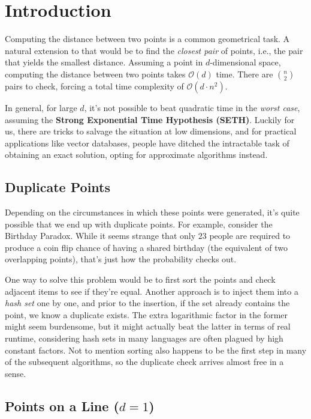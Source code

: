 
\chapter{Introduction}

Computing the distance between two points is a common geometrical task.
A natural extension to that would be to find the \textit{closest pair} of points,
i.e., the pair that yields the smallest distance. Assuming a point in $d$-dimensional
space, computing the distance between two points takes $\mathcal{O}(d)$ time.
There are $\binom{n}{2}$ pairs to check, forcing a total time complexity of
$\mathcal{O}(d \cdot n^{2})$.

In general, for large $d$, it's not possible to beat quadratic time in the \textit{worst case}, assuming the
\textbf{Strong Exponential Time Hypothesis (SETH)}. Luckily for us, there are tricks to salvage
the situation at low dimensions, and for practical applications like vector databases,
people have ditched the intractable task of obtaining an exact solution, opting for
approximate algorithms instead.

\section{Duplicate Points}

Depending on the circumstances in which these points were generated, it's quite possible that we
end up with duplicate points. For example, consider the Birthday Paradox. While it seems strange
that only $23$ people are required to produce a coin flip chance of having a shared birthday
(the equivalent of two overlapping points), that's just how the probability checks out.

One way to solve this problem would be to first sort the points and check adjacent items to see if
they're equal. Another approach is to inject them into a \textit{hash set} one by one, and prior to the
insertion, if the set already contains the point, we know a duplicate exists. The extra logarithmic
factor in the former might seem burdensome, but it might actually beat the latter in terms of real
runtime, considering hash sets in many languages are often plagued by high constant factors. Not to
mention sorting also happens to be the first step in many of the subsequent algorithms, so the duplicate
check arrives almost free in a sense.

\section{Points on a Line (\texorpdfstring{$d=1$}{d = 1})}

